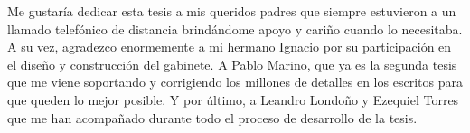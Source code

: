
\begin{acknowledgements}      


Me gustaría dedicar esta tesis a mis queridos padres que siempre estuvieron a un llamado telefónico de distancia brindándome apoyo y cariño cuando lo necesitaba. A su vez, agradezco enormemente a mi hermano Ignacio por su participación en el diseño y construcción del gabinete. A Pablo Marino, que ya es la segunda tesis que me viene soportando y corrigiendo los millones de detalles en los escritos para que queden lo mejor posible. Y por último, a Leandro Londoño y Ezequiel Torres que me han acompañado durante todo el proceso de desarrollo de la tesis.


\end{acknowledgements}
